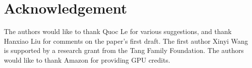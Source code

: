 \documentclass{article}
\begin{document}









\section*{Acknowledgement}
The authors would like to thank Quoc Le for various suggestions, and thank Hanxiao Liu for comments on the paper's first draft. The first author Xinyi Wang is supported by a research grant
from the Tang Family Foundation. The
authors would like to thank Amazon for providing
GPU credits.




\newpage
\appendix

\end{document}
